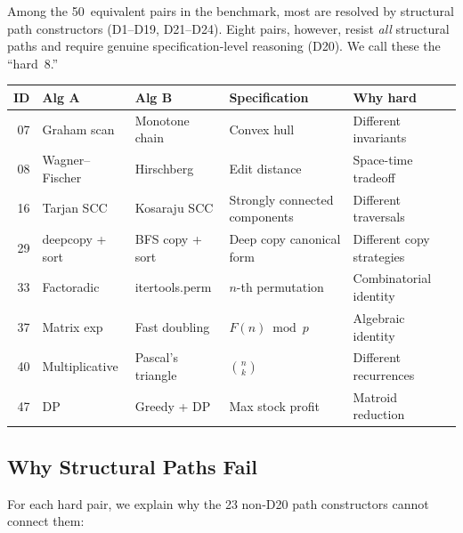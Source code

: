 Among the 50~equivalent pairs in the benchmark, most are resolved
by structural path constructors (D1--D19, D21--D24).  Eight pairs,
however, resist \emph{all} structural paths and require genuine
specification-level reasoning (D20).  We call these the ``hard~8.''

\begin{center}
\small
\begin{tabular}{r l l p{4.5cm} l}
  \textbf{ID} & \textbf{Alg A} & \textbf{Alg B} &
  \textbf{Specification} & \textbf{Why hard} \\
  \hline
  07 & Graham scan & Monotone chain &
    Convex hull &
    Different invariants \\
  08 & Wagner--Fischer & Hirschberg &
    Edit distance &
    Space-time tradeoff \\
  16 & Tarjan SCC & Kosaraju SCC &
    Strongly connected components &
    Different traversals \\
  29 & deepcopy + sort & BFS copy + sort &
    Deep copy canonical form &
    Different copy strategies \\
  33 & Factoradic & itertools.perm &
    $n$-th permutation &
    Combinatorial identity \\
  37 & Matrix exp & Fast doubling &
    $F(n) \bmod p$ &
    Algebraic identity \\
  40 & Multiplicative & Pascal's triangle &
    $\binom{n}{k}$ &
    Different recurrences \\
  47 & DP & Greedy + DP &
    Max stock profit &
    Matroid reduction \\
\end{tabular}
\end{center}

\subsection{Why Structural Paths Fail}

For each hard pair, we explain why the 23 non-D20 path constructors
cannot connect them:

